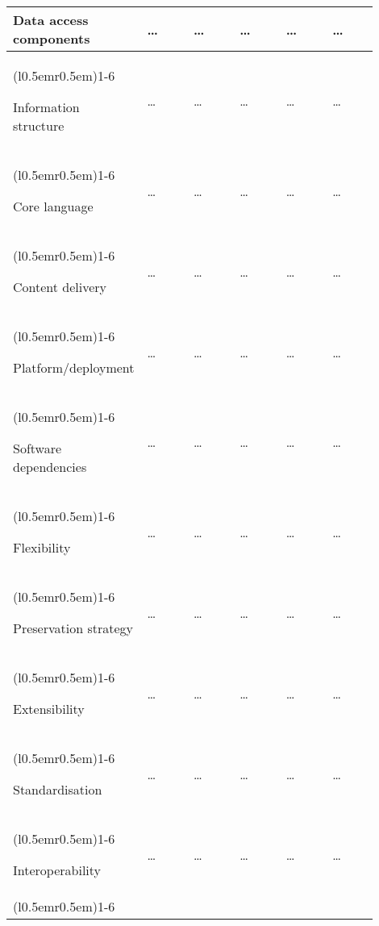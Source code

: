 \begin{longtable}{p{0.25\linewidth} p{0.13\linewidth} p{0.13\linewidth}
p{0.13\linewidth} p{0.13\linewidth} p{0.13\linewidth}}
 {Data access components}&
 {\ldots}&
 {\ldots}&
 {\ldots}&
 {\ldots}&
 {\ldots}\\

 \cmidrule[0.1pt](l{0.5em}r{0.5em}){1-6}

 {Information structure}&
 {\ldots}&
 {\ldots}&
 {\ldots}&
 {\ldots}&
 {\ldots}\\

 \cmidrule[0.1pt](l{0.5em}r{0.5em}){1-6}

 {Core language}&
 {\ldots}&
 {\ldots}&
 {\ldots}&
 {\ldots}&
 {\ldots}\\

 \cmidrule[0.1pt](l{0.5em}r{0.5em}){1-6}

 {Content delivery}&
 {\ldots}&
 {\ldots}&
 {\ldots}&
 {\ldots}&
 {\ldots}\\

 \cmidrule[0.1pt](l{0.5em}r{0.5em}){1-6}

 {Platform/deployment}&
 {\ldots}&
 {\ldots}&
 {\ldots}&
 {\ldots}&
 {\ldots}\\

 \cmidrule[0.1pt](l{0.5em}r{0.5em}){1-6}

 {Software dependencies}&
 {\ldots}&
 {\ldots}&
 {\ldots}&
 {\ldots}&
 {\ldots}\\

 \cmidrule[0.1pt](l{0.5em}r{0.5em}){1-6}

 {Flexibility}&
 {\ldots}&
 {\ldots}&
 {\ldots}&
 {\ldots}&
 {\ldots}\\

 \cmidrule[0.1pt](l{0.5em}r{0.5em}){1-6}

 {Preservation strategy}&
 {\ldots}&
 {\ldots}&
 {\ldots}&
 {\ldots}&
 {\ldots}\\

 \cmidrule[0.1pt](l{0.5em}r{0.5em}){1-6}

 {Extensibility}&
 {\ldots}&
 {\ldots}&
 {\ldots}&
 {\ldots}&
 {\ldots}\\

 \cmidrule[0.1pt](l{0.5em}r{0.5em}){1-6}

 {Standardisation}&
 {\ldots}&
 {\ldots}&
 {\ldots}&
 {\ldots}&
 {\ldots}\\

 \cmidrule[0.1pt](l{0.5em}r{0.5em}){1-6}

 {Interoperability}&
 {\ldots}&
 {\ldots}&
 {\ldots}&
 {\ldots}&
 {\ldots}\\

 \cmidrule[0.1pt](l{0.5em}r{0.5em}){1-6}


\end{longtable}
